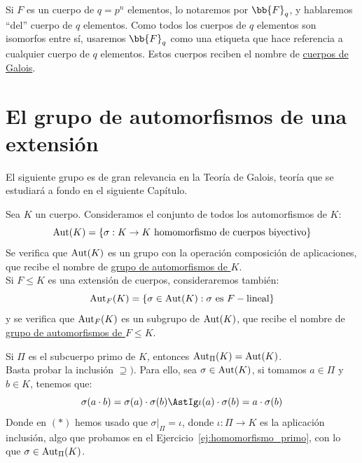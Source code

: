 \begin{notacion}
    Si $F$ es un cuerpo de $q=p^n$ elementos, lo notaremos por $\bb{F}_q$, y hablaremos ``del'' cuerpo de $q$ elementos. Como todos los cuerpos de $q$ elementos son isomorfos entre sí, usaremos $\bb{F}_q$ como una etiqueta que hace referencia a cualquier cuerpo de $q$ elementos. Estos cuerpos reciben el nombre de \underline{cuerpos de Galois}.
\end{notacion}

\section{El grupo de automorfismos de una extensión}

El siguiente grupo es de gran relevancia en la Teoría de Galois, teoría que se estudiará a fondo en el siguiente Capítulo.
\begin{definicion}
    Sea $K$ un cuerpo. Consideramos el conjunto de todos los automorfismos de $K$:
    \begin{equation*}
        \Aut(K) = \{\sigma:K\to K \text{\ homomorfismo de cuerpos biyectivo}\}
    \end{equation*}
    Se verifica que $\operatorname{Aut}(K)$ es un grupo con la operación composición de aplicaciones, que recibe el nombre de \underline{grupo de automorfismos de $K$}. \\

    \noindent
    Si $F\leq K$ es una extensión de cuerpos, consideraremos también:
    \begin{equation*}
        \Aut_F(K) = \{\sigma\in \Aut(K) : \sigma \text{\ es\ } F-\text{lineal}\}
    \end{equation*}
    y se verifica que $\operatorname{Aut}_F(K)$ es un subgrupo de $\operatorname{Aut}(K)$, que recibe el nombre de \underline{grupo de automorfismos de $F\leq K$}.\\
\end{definicion}

\begin{ejercicio}\label{ej:aut_primo}
    Si $\Pi$ es el subcuerpo primo de $K$, entonces $\operatorname{Aut}_\Pi(K) = \operatorname{Aut}(K)$.\\

    \noindent
    Basta probar la inclusión $\supseteq)$. Para ello, sea $\sigma\in \operatorname{Aut}(K)$, si tomamos $a\in \Pi$ y $b\in K$, tenemos que:
    \begin{equation*}
        \sigma(a\cdot b) = \sigma(a)\cdot \sigma(b) \AstIg \iota(a)\cdot \sigma(b) = a\cdot \sigma(b)
    \end{equation*}
    Donde en $(\ast)$ hemos usado que $\sigma\big|_\Pi=\iota$, donde $\iota:\Pi\to K$ es la aplicación inclusión, algo que probamos en el Ejercicio~\ref{ej:homomorfismo_primo}, con lo que $\sigma\in \operatorname{Aut}_\Pi(K)$.
\end{ejercicio}

